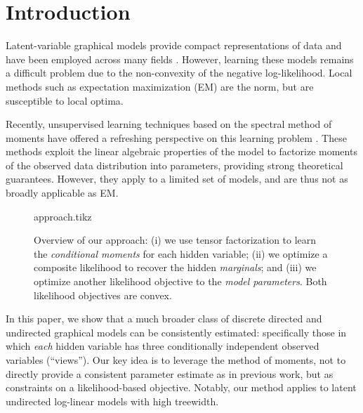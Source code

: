\section{Introduction}
\label{sec:introduction}

Latent-variable graphical models provide compact representations of data
and have been employed across many fields %
\cite{ghahramani1999variational,jaakkola1999variational,blei03lda,quattoni04crf,beaumont2004bayesian,haghighi06prototype}.
However, learning these models remains a difficult problem due to the
non-convexity of the negative log-likelihood.  Local methods such as expectation maximization (EM)
are the norm, but are susceptible to local optima.

Recently, unsupervised learning techniques based on the spectral method of moments
have offered a refreshing perspective on
this learning problem
\citep{mossel2005learning,
hsu09spectral,
bailly2010spectral,
song2011spectral,
anandkumar11tree,
anandkumar12lda,
anandkumar12moments,
hsu12identifiability,
balle12automata}.
These methods exploit the linear algebraic properties of the model to
factorize moments of the observed data distribution into parameters,
providing strong theoretical guarantees.
However, they apply to a limited set of models, and are thus
not as broadly applicable as EM.

\begin{figure}[t]
  \label{fig:approach}
  \centering
  {approach.tikz}
  \caption{
  Overview of our approach:
  (i) we use tensor factorization to learn the \emph{conditional moments}
  for each hidden variable;
  (ii) we optimize a composite likelihood to recover the hidden \emph{marginals};
  and (iii) we optimize another likelihood objective to the \emph{model parameters}.
  Both likelihood objectives are convex.
  }
\end{figure}


In this paper,
we show that a much broader class of discrete directed and undirected graphical
models can be consistently estimated:
specifically those in which \emph{each} hidden variable has three conditionally
independent observed variables (``views'').
Our key idea is to leverage the method of moments,
not to directly provide a consistent parameter estimate as in previous work,
but as constraints on a likelihood-based objective.
Notably, our method applies to latent undirected log-linear models with high treewidth.

